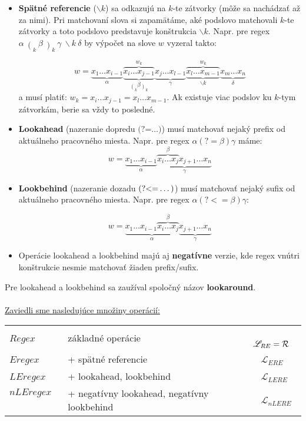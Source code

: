 \documentclass[myposter,portrait,plainboxedsections]{sciposter}
\def\R{{\cal R}} %
\def\re{Regex}
\def\e{Eregex}
\def\le{LEregex}
\def\nle{nLEregex}
\def\rel{{\mathscr{L}_{RE}}}
\def\el{\mathscr{L}_{ERE}}
\def\lel{\mathscr{L}_{LERE}}
\def\nlel{\mathscr{L}_{nLERE}}
\def\lookahead{\text{(?=}}
\def\lookbehind{\text{(?\textless =}}
\begin{document}
\begin{multicols*}{3}
\begin{itemize}

\item \textbf{Spätné referencie} ($\backslash k$) sa odkazujú na $k$-te zátvorky (môže sa nachádzať až za nimi). Pri matchovaní slova si zapamätáme, aké podslovo matchovali $k$-te zátvorky a toto podslovo predstavuje konštrukcia $\backslash k$. Napr. pre regex
 $\displaystyle \alpha~ \mathop(_k ~\beta ~\mathop)_k ~\gamma ~\backslash k ~\delta$ by výpočet na slove $w$ vyzeral takto:

$$w = \underbrace{x_1\dots x_{i-1}}_\alpha 
 \overbrace{\underbrace{x_i\dots x_{j-1}}_{ \displaystyle{\mathop(_k\beta \mathop)_k}}}^{w_k} 
 \underbrace{x_j\dots x_{l-1}}_\gamma 
 \overbrace{\underbrace{x_l\dots x_{m-1}}_{\backslash k}}^{w_k}
 \underbrace{x_{m}\dots x_{n}}_\delta$$
a musí platiť: $w_k= x_i\dots x_{j-1} = x_l\dots x_{m-1} $. Ak existuje viac podslov ku $k$-tym zátvorkám, berie sa vždy to posledné.

\item \textbf{Lookahead} (nazeranie dopredu $\lookahead\dots)$) musí matchovať nejaký prefix od aktuálneho pracovného miesta. Napr. pre regex $\alpha(?=\beta)\gamma$ máme:
 $$w = \underbrace{x_1\dots x_{i-1}}_\alpha \underbrace{\overbrace{x_i \dots x_j}^\beta x_{j+1} \dots x_n }_\gamma$$ 

\item \textbf{Lookbehind} (nazeranie dozadu $\lookbehind\dots)$) musí matchovať nejaký sufix od aktuálneho pracovného miesta. Napr. pre regex $\alpha(?<=\beta)\gamma$:

$$w = \underbrace{x_1\dots x_{i-1} \overbrace{x_i \dots x_j}^\beta}_\alpha \underbrace{x_{j+1} \dots x_n }_\gamma$$

\item Operácie lookahead a lookbehind majú aj \textbf{negatívne} verzie, kde regex vnútri konštrukcie nesmie matchovať žiaden prefix/sufix.

\end{itemize}
Pre lookahead a lookbehind sa zaužíval spoločný názov \textbf{lookaround}.
\\ \\
\underline{Zaviedli sme nasledujúce množiny operácií:}

\begin{tabular}{lll}
$\re$ ~& základné operácie &~ $\rel = \R$ \\
$\e$ ~& + spätné referencie &~ $\el$ \\
$\le$ ~& + lookahead, lookbehind &~ $\lel$ \\
$\nle$ ~& + negatívny lookahead, negatívny lookbehind &~ $\nlel$
\end{tabular}


\end{multicols*}
\end{document}
